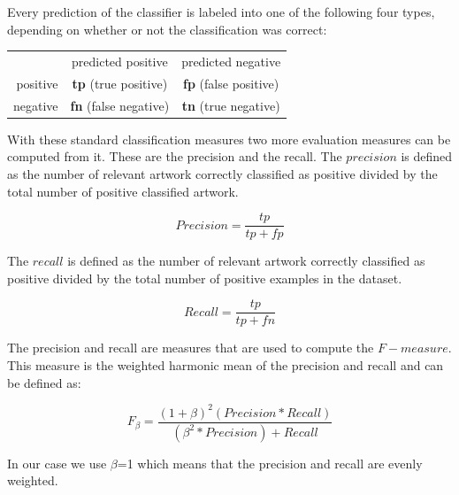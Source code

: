 Every prediction of the classifier is labeled into one of the following four types,
depending on whether or not the classification was correct:

\begin{tabular}{r|c|c|}
\multicolumn{1}{r}{}
 &  \multicolumn{1}{c}{predicted positive}
 & \multicolumn{1}{c}{predicted negative} \\
\cline{2-3}
positive & \textbf{tp} (true positive) & \textbf{fp} (false positive) \\
\cline{2-3}
negative & \textbf{fn} (false negative) & \textbf{tn} (true negative) \\
\cline{2-3}
\end{tabular}

With these standard classification measures two more evaluation measures can be computed from it.
These are the precision and the recall.
The $precision$ is defined as the number of relevant artwork correctly classified as positive divided by the total number of positive classified artwork.

\begin{equation}
Precision = \frac{tp}{tp + fp}
\end{equation}

The $recall$ is defined as the number of relevant artwork correctly classified as positive divided by the total number of positive examples in the dataset.

\begin{equation}
Recall = \frac{tp}{tp + fn}
\end{equation}

The precision and recall are measures that are used to compute the $F-measure$.
This measure is the weighted harmonic mean of the precision and recall and can be defined as:

\begin{equation}
F_\beta = \frac{(1+\beta)^2 (Precision * Recall)}{(\beta ^2 * Precision) + Recall}
\end{equation}

In our case we use $\beta$=1 which means that the precision and recall are evenly weighted.
